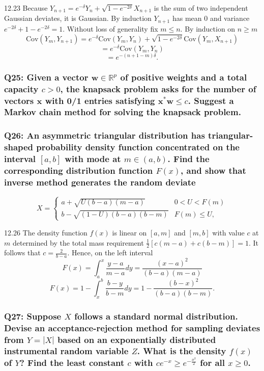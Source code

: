 \documentclass[8pt]{article}
\begin{document}
12.23 Because \( Y_{n+1} = e^{-\delta}Y_n + \sqrt{1 - e^{-2\delta}}X_{n+1} \) is the sum of two independent Gaussian deviates, it is Gaussian. By induction \( Y_{n+1} \) has mean 0 and variance \( e^{-2\delta} + 1 - e^{-2\delta} = 1 \). Without loss of generality fix \( m \leq n \). By induction on \( n \geq m \)
\[
\text{Cov}(Y_m, Y_{n+1}) = e^{-\delta} \text{Cov}(Y_m, Y_n) + \sqrt{1 - e^{-2\delta}} \text{Cov}(Y_m, X_{n+1})
\]
\[
= e^{-\delta} \text{Cov}(Y_m, Y_n)
\]
\[
= e^{-(n+1-m)\delta}.
\]

\subsubsection*{Q25: Given a vector \( \mathbf{w} \in \mathbb{R}^p \) of positive weights and a total capacity \( c > 0 \), the knapsack problem asks for the number of vectors \( \mathbf{x} \) with 0/1 entries satisfying \( \mathbf{x}^* \mathbf{w} \leq c \). Suggest a Markov chain method for solving the knapsack problem.}

\subsubsection*{Q26: An asymmetric triangular distribution has triangular-shaped probability density function concentrated on the interval \([a, b]\) with mode at \(m \in (a, b)\). Find the corresponding distribution function \(F(x)\), and show that inverse method generates the random deviate}
\[
X = 
\begin{cases} 
a + \sqrt{U(b - a)(m - a)} & 0 < U < F(m) \\
b - \sqrt{(1 - U)(b - a)(b - m)} & F(m) \leq U,
\end{cases}
\]

12.26 The density function \(f(x)\) is linear on \([a, m]\) and \([m, b]\) with value \(c\) at \(m\) determined by the total mass requirement \(\frac{1}{2}[c(m - a) + c(b - m)] = 1\). It follows that \(c = \frac{2}{b-a}\). Hence, on the left interval
\[
F(x) = \int_a^x \frac{y - a}{m - a} dy = \frac{(x - a)^2}{(b - a)(m - a)}
\]
\[
F(x) = 1 - \int_x^b \frac{b - y}{b - m} dy = 1 - \frac{(b - x)^2}{(b - a)(b - m)}.
\]


\subsubsection*{Q27: Suppose \(X\) follows a standard normal distribution. Devise an acceptance-rejection method for sampling deviates from \(Y = |X|\) based on an exponentially distributed instrumental random variable \(Z\). What is the density \(f(x)\) of \(Y\)? Find the least constant \(c\) with \(ce^{-x} \geq e^{-\frac{x^2}{2}}\) for all \(x \geq 0\).}
\end{document}
